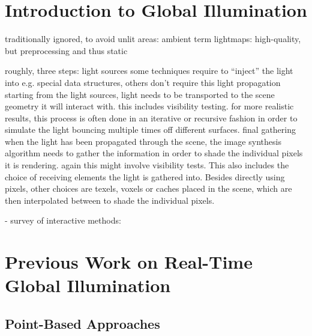 \section{Introduction to Global Illumination}


\begin{outline}


\1 traditionally ignored, to avoid unlit areas: ambient term
\1 lightmaps: high-quality, but preprocessing and thus static

\1 roughly, three steps:
    \2 light sources
        \3 some techniques require to ``inject'' the light into e.g. special data structures, others don't require this
    \2 light propagation
        \3 starting from the light sources, light needs to be transported to the scene geometry it will interact with. this includes visibility testing. for more realistic results, this process is often done in an iterative or recursive fashion in order to simulate the light bouncing multiple times off different surfaces.
    \2 final gathering
        \3 when the light has been propagated through the scene, the image synthesis algorithm needs to gather the information in order to shade the individual pixels it is rendering. again this might involve visibility tests. This also includes the choice of receiving elements the light is gathered into. Besides directly using pixels, other choices are texels, voxels or caches placed in the scene, which are then interpolated between to shade the individual pixels.

\end{outline}

- survey of interactive methods: \cite{Ritschel:2012:SAI:2283296.2283310}

\section{Previous Work on Real-Time Global Illumination}


\subsection{Point-Based Approaches}

